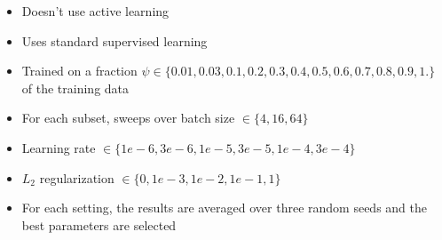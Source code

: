 \documentclass[preview]{standalone}
\begin{document}
\begin{center}
\begin{itemize}
                \item Doesn't use active learning
                \item Uses standard supervised learning
                \item Trained on a fraction $\psi \in \{0.01, 0.03, 0.1, 0.2, 0.3, 0.4, 0.5, 0.6, 0.7, 0.8, 0.9, 1.\}$ \\
                of the training data
                \item For each subset, sweeps over batch size $\in \{4, 16, 64\}$
                \item Learning rate $\in \{1e-6, 3e-6, 1e-5, 3e-5, 1e-4, 3e-4\}$
                \item $L_2$ regularization $\in \{0, 1e-3, 1e-2, 1e-1, 1\}$
                \item For each setting, the results are averaged over three random seeds and the best parameters are selected
            \end{itemize}
\end{center}
\end{document}
